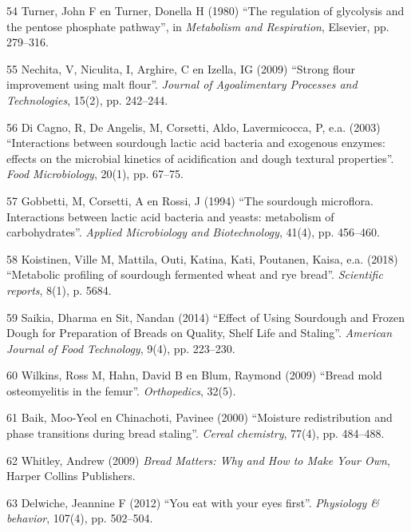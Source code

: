 \documentclass[
  11pt,
  dutch,
]{memoir}
\newlength{\cslhangindent}
\newenvironment{cslreferences}%
  {\setlength{\parindent}{0pt}%
  \everypar{\setlength{\hangindent}{\cslhangindent}}\ignorespaces}%
  {\par}
\begin{document}
\begin{cslreferences}
\leavevmode\hypertarget{ref-turner1980regulation}{}%
54 Turner, John F en Turner, Donella H (1980) ``The regulation of
glycolysis and the pentose phosphate pathway'', in \emph{Metabolism and
Respiration}, Elsevier, pp. 279--316.

\leavevmode\hypertarget{ref-nechita2009strong}{}%
55 Nechita, V, Niculita, I, Arghire, C en Izella, IG (2009) ``Strong
flour improvement using malt flour''. \emph{Journal of Agoalimentary
Processes and Technologies}, 15(2), pp. 242--244.

\leavevmode\hypertarget{ref-di2003interactions}{}%
56 Di Cagno, R, De Angelis, M, Corsetti, Aldo, Lavermicocca, P, e.a.
(2003) ``Interactions between sourdough lactic acid bacteria and
exogenous enzymes: effects on the microbial kinetics of acidification
and dough textural properties''. \emph{Food Microbiology}, 20(1), pp.
67--75.

\leavevmode\hypertarget{ref-gobbetti1994sourdough}{}%
57 Gobbetti, M, Corsetti, A en Rossi, J (1994) ``The sourdough
microflora. Interactions between lactic acid bacteria and yeasts:
metabolism of carbohydrates''. \emph{Applied Microbiology and
Biotechnology}, 41(4), pp. 456--460.

\leavevmode\hypertarget{ref-koistinen2018metabolic}{}%
58 Koistinen, Ville M, Mattila, Outi, Katina, Kati, Poutanen, Kaisa,
e.a. (2018) ``Metabolic profiling of sourdough fermented wheat and rye
bread''. \emph{Scientific reports}, 8(1), p. 5684.

\leavevmode\hypertarget{ref-saikia2014effect}{}%
59 Saikia, Dharma en Sit, Nandan (2014) ``Effect of Using Sourdough and
Frozen Dough for Preparation of Breads on Quality, Shelf Life and
Staling''. \emph{American Journal of Food Technology}, 9(4), pp.
223--230.

\leavevmode\hypertarget{ref-wilkins2009bread}{}%
60 Wilkins, Ross M, Hahn, David B en Blum, Raymond (2009) ``Bread mold
osteomyelitis in the femur''. \emph{Orthopedics}, 32(5).

\leavevmode\hypertarget{ref-baik2000moisture}{}%
61 Baik, Moo-Yeol en Chinachoti, Pavinee (2000) ``Moisture
redistribution and phase transitions during bread staling''.
\emph{Cereal chemistry}, 77(4), pp. 484--488.

\leavevmode\hypertarget{ref-breadmatters}{}%
62 Whitley, Andrew (2009) \emph{Bread Matters: Why and How to Make Your
Own}, Harper Collins Publishers.

\leavevmode\hypertarget{ref-delwiche2012you}{}%
63 Delwiche, Jeannine F (2012) ``You eat with your eyes first''.
\emph{Physiology \& behavior}, 107(4), pp. 502--504.


\end{cslreferences}
\end{document}
